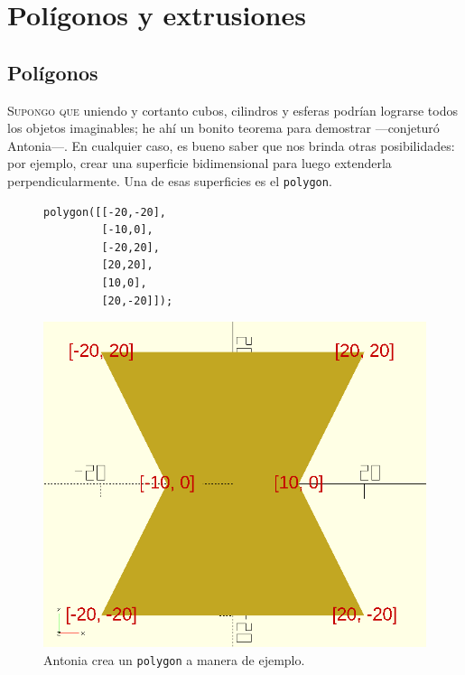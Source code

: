 \chapter{Polígonos y extrusiones}

\section{Polígonos}


\lettrine[ante=\raisebox{-1.5ex}{\Large ---},lines=2]{S}{upongo que}
uniendo y cortanto cubos, cilindros y esferas podrían lograrse todos
los objetos imaginables; he ahí un bonito teorema para demostrar
---conjeturó Antonia---. En cualquier caso, es bueno saber que
\openscad{} nos brinda otras posibilidades: por ejemplo, crear una
superficie bidimensional para luego extenderla perpendicularmente. Una
de esas superficies es el \lstinline!polygon!.

  \begin{figure}[ht]
  \begin{minipage}[]{.5\textwidth}%
    \begin{lstlisting}
polygon([[-20,-20],
         [-10,0],
         [-20,20],
         [20,20],
         [10,0],
         [20,-20]]);
    \end{lstlisting}
  \end{minipage}\hfill
  \begin{minipage}[]{.5\textwidth}%
      \flushright
      \includegraphics[width=.95\textwidth]{imagenes/poligono-1}
    \end{minipage}
    \caption{Antonia crea un \lstinline!polygon! a manera de ejemplo.}
    \label{fig:poligono-1}
  \end{figure}


